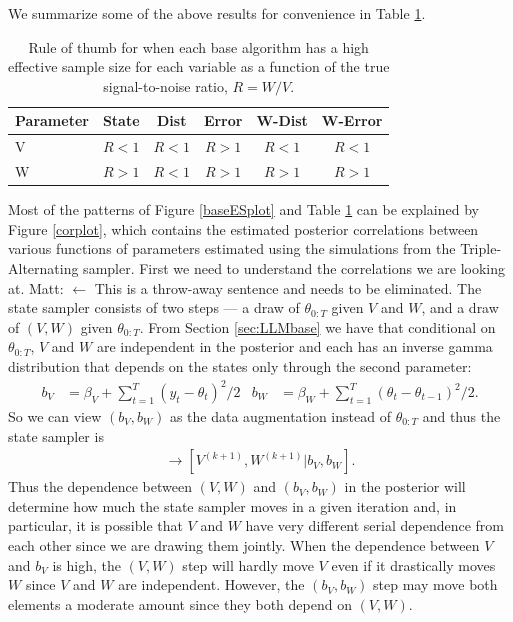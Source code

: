 \documentclass{article}
\newcommand{\matt}[1]{{\color{red} Matt: #1}}
\begin{document}
We summarize some of the above results for convenience in Table \ref{tab:stnmix}.
\begin{table}
  \centering
  \begin{tabular}{|l|ccccc|}\hline
    Parameter & State & Dist & Error & W-Dist & W-Error \\\hline
    V & $R < 1$ & $R < 1$ & $R > 1$ & $R < 1$ & $R < 1$\\
    W & $R > 1$ & $R < 1$ & $R > 1$ & $R > 1$ & $R > 1$ \\\hline
  \end{tabular}
  \caption{Rule of thumb for when each base algorithm has a high effective sample size for each variable as a function of the true signal-to-noise ratio, $R=W/V$.}
  \label{tab:stnmix}
\end{table}

Most of the patterns of Figure \ref{baseESplot} and Table \ref{tab:stnmix} can be explained by Figure \ref{corplot}, which contains the estimated posterior correlations between various functions of parameters estimated using the simulations from the Triple-Alternating sampler. First we need to understand the correlations we are looking at. \matt{$\leftarrow$ This is a throw-away sentence and needs to be eliminated.} The state sampler consists of two steps --- a draw of $\theta_{0:T}$ given $V$ and $W$, and a draw of $(V,W)$ given $\theta_{0:T}$. From Section \ref{sec:LLMbase} we have that conditional on $\theta_{0:T}$, $V$ and $W$ are independent in the posterior and each has an inverse gamma distribution that depends on the states only through the second parameter:
\begin{align*}
  b_V &= \beta_V + \sum_{t=1}^T(y_t - \theta_t)^2/2 &
  b_W &= \beta_W + \sum_{t=1}^T(\theta_t - \theta_{t-1})^2/2.
\end{align*}
So we can view $(b_V,b_W)$ as the data augmentation instead of $\theta_{0:T}$ and thus the state sampler is
\begin{align*}
  [b_V, b_W|V^{(k)},W^{(k)}] \to [V^{(k+1)},W^{(k+1)}|b_V,b_W].
\end{align*}
Thus the dependence between $(V,W)$ and $(b_V,b_W)$ in the posterior will determine how much the state sampler moves in a given iteration and, in particular, it is possible that $V$ and $W$ have very different serial dependence from each other since we are drawing them jointly. When the dependence between $V$ and $b_V$ is high, the $(V,W)$ step will hardly move $V$ even if it drastically moves $W$ since $V$ and $W$ are independent. However, the $(b_V,b_W)$ step may move both elements a moderate amount since they both depend on $(V,W)$.
\end{document}
